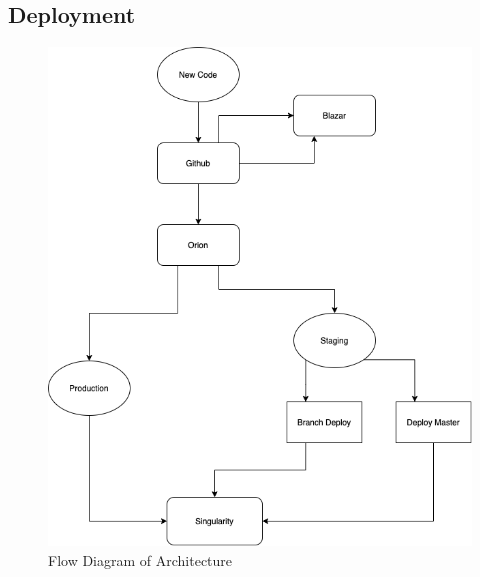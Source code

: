 \subsection{Deployment}
\begin{figure}[ht]
  \centering
  \includegraphics[scale=0.5]{multicurrency/deployment.png}
  \caption{Flow Diagram of Architecture}
\end{figure}

